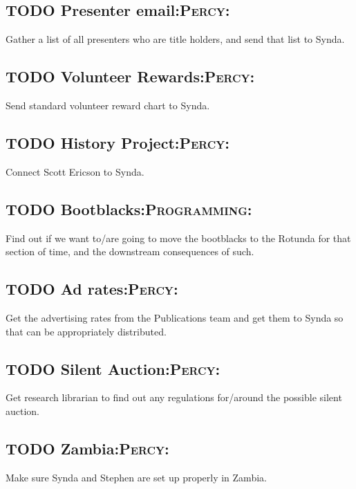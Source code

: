 \documentclass[captions=tablesignature]{scrartcl}
\begin{document}
\subsection{{\bfseries\sffamily TODO} Presenter email\hfill{}\textsc{:Percy:}}
\label{sec-2-2}
Gather a list of all presenters who are title holders, and send
that list to Synda.

\subsection{{\bfseries\sffamily TODO} Volunteer Rewards\hfill{}\textsc{:Percy:}}
\label{sec-2-3}
Send standard volunteer reward chart to Synda.

\subsection{{\bfseries\sffamily TODO} History Project\hfill{}\textsc{:Percy:}}
\label{sec-2-4}
Connect Scott Ericson to Synda.

\subsection{{\bfseries\sffamily TODO} Bootblacks\hfill{}\textsc{:Programming:}}
\label{sec-2-5}
Find out if we want to/are going to move the bootblacks to the
Rotunda for that section of time, and the downstream consequences
of such.

\subsection{{\bfseries\sffamily TODO} Ad rates\hfill{}\textsc{:Percy:}}
\label{sec-2-6}
Get the advertising rates from the Publications team and get them
to Synda so that can be appropriately distributed.

\subsection{{\bfseries\sffamily TODO} Silent Auction\hfill{}\textsc{:Percy:}}
\label{sec-2-7}
Get research librarian to find out any regulations for/around the
possible silent auction.

\subsection{{\bfseries\sffamily TODO} Zambia\hfill{}\textsc{:Percy:}}
\label{sec-2-8}
Make sure Synda and Stephen are set up properly in Zambia.
\end{document}
